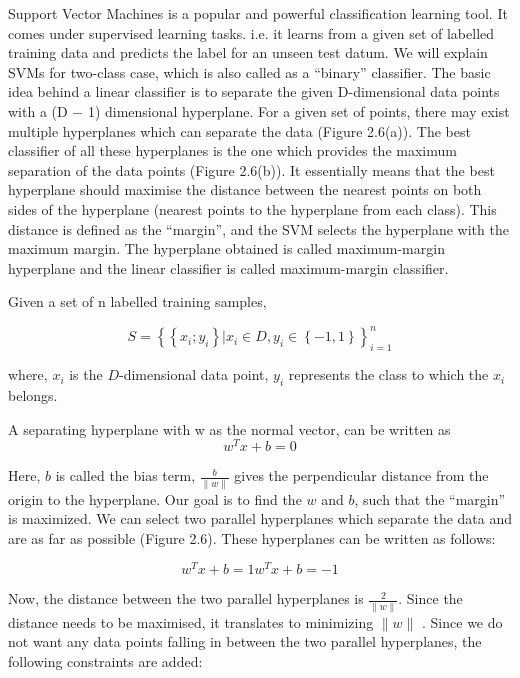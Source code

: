 Support Vector Machines is a popular and powerful classification learning tool. It comes under supervised learning tasks. i.e. it learns from a given set of labelled training data and predicts  the label for an unseen test datum. We will explain SVMs for two-class case, which is also called as a ``binary'' classifier. The basic idea behind a linear classifier is to separate the given D-dimensional data points with a (D − 1) dimensional hyperplane. For a given set of points, there may exist multiple hyperplanes which can separate the data (Figure 2.6(a)). The best classifier of all these hyperplanes is the one which provides the maximum separation of the data points (Figure 2.6(b)). It essentially means that the best hyperplane should maximise the distance between the nearest points on both sides of the hyperplane (nearest points to the hyperplane from each class). This distance is defined as the ``margin'', and the SVM selects the hyperplane with the maximum margin. The hyperplane obtained is called maximum-margin hyperplane and the linear classifier is called maximum-margin classifier.

Given a set of n labelled training samples,

\begin{equation}
S =\left\lbrace \left\lbrace x_i ; y_i \right\rbrace | x_i \in D , y_i \in \left\lbrace −1, 1 \right\rbrace \right\rbrace _{i=1}^n
\end{equation}

where, $x_i$ is the $D$-dimensional data point, $y_i$ represents the class to which the $x_i$ belongs.

A separating hyperplane with w as the normal vector, can be written as
\begin{equation}
{w^T}x + b = 0
\end{equation}

Here, $b$ is called the bias term, $\frac{b}{\|w\|}$ gives the perpendicular distance from the origin to the hyperplane. Our goal is to find the $w$ and $b$, such that the ``margin'' is maximized. We can select two parallel hyperplanes which separate the data and are as far as possible (Figure 2.6). These hyperplanes can be written as follows:

\begin{equation}
{w^T}x + b = 1
{w^T}x + b = -1
\end{equation}

Now, the distance between the two parallel hyperplanes is $\frac{2}{\|w\|}$. Since the distance needs to be maximised, it translates to minimizing $\|w\|$ . Since we do not want any data points falling in between the two parallel hyperplanes, the following constraints are added:


